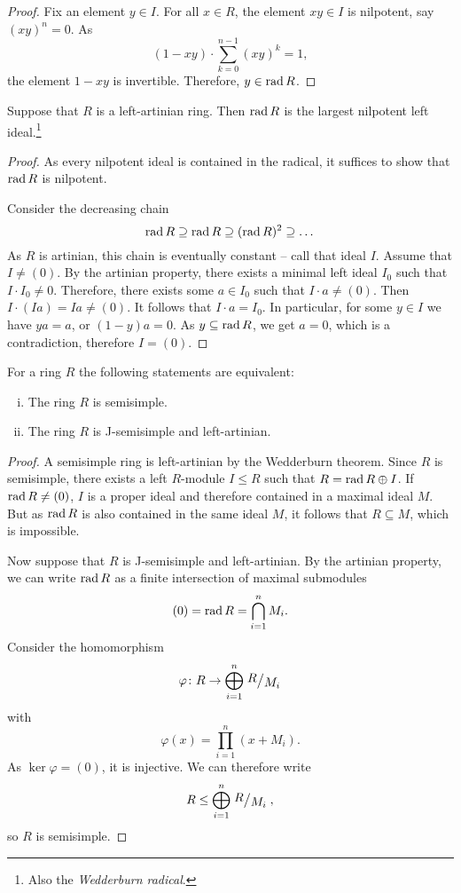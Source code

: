 \begin{proof}
Fix an element $y \in I$. For all $x \in R$, the element $xy \in I$
is nilpotent, say $(xy)^n = 0$. As
\[
(1 - xy) \cdot \sum_{k=0}^{n-1} (xy)^k = 1,
\]
the element $1 - xy$ is invertible. Therefore, $y \in \operatorname{rad} R$.
\end{proof}

\begin{izrek}
Suppose that $R$ is a left-artinian ring. Then $\operatorname{rad} R$ is the
largest nilpotent left
ideal.\footnote{Also the \emph{Wedderburn radical}.}
\end{izrek}

\begin{proof}
As every nilpotent ideal is contained in the radical, it suffices
to show that $\operatorname{rad} R$ is nilpotent.

Consider the decreasing chain
\[
\operatorname{rad} R \supseteq \operatorname{rad} R \supseteq (\operatorname{rad} R)^2 \supseteq \dots
\]
As $R$ is artinian, this chain is eventually constant -- call that
ideal $I$. Assume that $I \ne (0)$. By the artinian property, there
exists a minimal left ideal $I_0$ such that $I \cdot I_0 \ne 0$.
Therefore, there exists some $a \in I_0$ such that
$I \cdot a \ne (0)$. Then $I \cdot (Ia) = Ia \ne (0)$. It follows
that $I \cdot a = I_0$. In particular, for some $y \in I$ we have
$ya = a$, or $(1-y) a = 0$. As $y \subseteq \operatorname{rad} R$, we get
$a = 0$, which is a contradiction, therefore $I = (0)$.
\end{proof}

\begin{izrek}
For a ring $R$ the following statements are equivalent:

\begin{enumerate}[i)]
\item The ring $R$ is semisimple.
\item The ring $R$ is J-semisimple and left-artinian.
\end{enumerate}
\end{izrek}

\begin{proof}
A semisimple ring is left-artinian by the Wedderburn theorem. Since
$R$ is semisimple, there exists a left $R$-module $I \leq R$ such
that $R = \operatorname{rad} R \oplus I$. If $\operatorname{rad} R \ne (0)$, $I$ is a proper
ideal and therefore contained in a maximal ideal $M$. But as
$\operatorname{rad} R$ is also contained in the same ideal $M$, it follows that
$R \subseteq M$, which is impossible.

Now suppose that $R$ is J-semisimple and left-artinian. By
the artinian property, we can write $\operatorname{rad} R$ as a finite
intersection of maximal submodules
\[
(0) = \operatorname{rad} R = \bigcap_{i=1}^n M_i.
\]
Consider the homomorphism
\[
\varphi \colon R \to \bigoplus_{i=1}^n \kvoc{R}{M_i}
\]
with
\[
\varphi(x) = \prod_{i=1}^n (x + M_i).
\]
As $\ker \varphi = (0)$, it is injective. We can therefore write
\[
R \leq \bigoplus_{i=1}^n \kvoc{R}{M_i},
\]
so $R$ is semisimple.
\end{proof}

